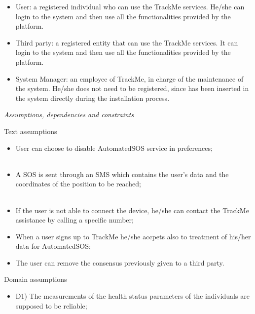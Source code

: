 \documentclass{article}
\begin{document}
\begin{legal}
\begin{legal}
{			\begin{itemize}
			 \item User: a registered individual who can use the TrackMe services. He/she can login to the system and then use all the functionalities provided by the platform.\\
			\item Third party: a registered entity that can use the TrackMe services. It can login to the system and then use all the functionalities provided by the platform.\\
 			\item System Manager:  an employee of TrackMe, in charge of the maintenance of the system. He/she does not need to be registered, since has been inserted in the system directly during the installation process.\\
			\end{itemize}
			}
		\item \textit{Assumptions, dependencies and constraints}\\
			\begin{legal}
    			\item Text assumptions\\
    			{\normalfont
				\begin{itemize}
					\item User can choose to disable AutomatedSOS service in preferences;\\\
					\item A SOS is sent through an SMS which contains the user's data and the coordinates of the position to be reached;\\\
					\item If the user is not able to connect the device, he/she can contact the TrackMe assistance by calling a specific number;\\
					\item When a user signs up to TrackMe he/she accpets also to treatment of his/her data for AutomatedSOS;\\
					\item The user can remove the consensus previously given to a third party.\\
				\end{itemize}}
			\item Domain assumptions \\
			{\normalfont
				\begin{itemize}
				\item D1) The measurements of the health status parameters of the individuals are supposed to be reliable;\\

\end{itemize}}
\end{legal}
\end{legal}
\end{legal}
\end{document}
